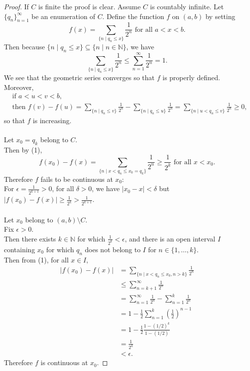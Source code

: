 \begin{proof}
    If $C$ is finite the proof is clear.
    Assume $C$ is countably infinite.
    Let $\{q_n\}_{n=1}^\infty$ be an enumeration of $C$.
    Define the function $f$ on $(a,b)$ by setting
    \[
        f(x)=\sum_{\{n\mid q_n\le x\}}\frac{1}{2^n}\text{ for all }a<x<b.
    \]
    Then because $\{n\mid q_n\le x\}\subseteq\{n\mid n\in\mathbb{N}\}$, we have
    \[
        \sum_{\{n\mid q_n\le x\}}\frac{1}{2^n}\le \sum_{n=1}^\infty\frac{1}{2^n}=1.
    \]
    We see that the geometric series converges so that $f$ is properly defined.
    Moreover,
    \begin{align*}
        &\text{if }a<u<v<b,\\
        &\text{then }f(v)-f(u)=\sum_{\{n\mid q_n\le v\}}\frac{1}{2^n}-\sum_{\{n\mid q_n\le u\}}\frac{1}{2^n}=\sum_{\{n\mid u< q_n\le v\}}\frac{1}{2^n}\ge0,\tag{1}
    \end{align*}
    so that $f$ is increasing.\\
    \\Let $x_0=q_k$ belong to $C$.
    \\Then by (1),
    \[
        f(x_0)-f(x)=\sum_{\{n\mid x< q_n\le x_0=q_k\}}\frac{1}{2^n}\ge\frac{1}{2^k}\text{ for all }x<x_0.
    \]
    Therefore $f$ fails to be continuous at $x_0$:
    \\For $\epsilon=\frac{1}{2^{k+1}}>0$, for all $\delta>0$, we have $|x_0-x|<\delta$ but $|f(x_0)-f(x)|\ge\frac{1}{2^k}>\frac{1}{2^{k+1}}$.\\
    \\Let $x_0$ belong to $(a,b)\setminus C$.
    \\Fix $\epsilon>0$.
    \\Then there exists $k\in\mathbb{N}$ for which $\frac{1}{2^k}<\epsilon$, and there is an open interval $I$ containing $x_0$ for which $q_n$ does not belong to $I$ for $n\in\{1,\dots,k\}$.
    \\Then from (1), for all $x\in I$,
    \begin{align*}
        |f(x_0)-f(x)|&=\sum_{\{n\mid x< q_n\le x_0,n>k\}}\frac{1}{2^n}\\
        &\le\sum_{n={k+1}}^\infty\frac{1}{2^n}\\
        &=\sum_{n=1}^\infty\frac{1}{2^n}-\sum_{n=1}^k\frac{1}{2^n}\\
        &=1-\frac{1}{2}\sum_{n=1}^k\left(\frac{1}{2}\right)^{n-1}\\
        &=1-\frac{1}{2}\frac{1-(1/2)^k}{1-(1/2)}\\
        &=\frac{1}{2^k}\\
        &<\epsilon.
    \end{align*}
    Therefore $f$ is continuous at $x_0$.
\end{proof}
